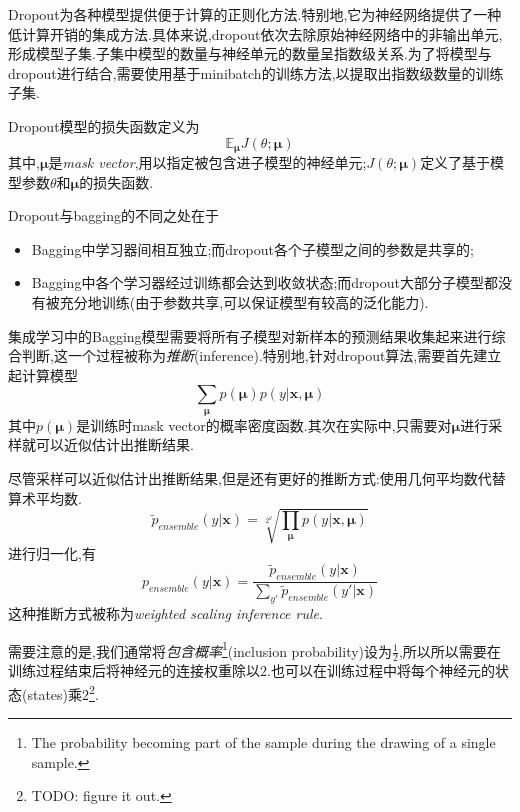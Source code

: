 Dropout为各种模型提供便于计算的正则化方法.特别地,它为神经网络提供了一种低计算开销的集成方法.具体来说,dropout依次去除原始神经网络中的非输出单元,形成模型子集.子集中模型的数量与神经单元的数量呈指数级关系.为了将模型与dropout进行结合,需要使用基于minibatch的训练方法,以提取出指数级数量的训练子集.

Dropout模型的损失函数定义为
\begin{equation}
\mathbb E_{\mathbf\mu}J(\theta;\mathbf\mu)
\end{equation}
其中,$\mathbf\mu$是\textit{mask vector},用以指定被包含进子模型的神经单元;$J(\theta;\mathbf\mu)$定义了基于模型参数$\theta$和$\mathbf\mu$的损失函数.

Dropout与bagging的不同之处在于
\begin{itemize}
    \item Bagging中学习器间相互独立;而dropout各个子模型之间的参数是共享的;
    \item Bagging中各个学习器经过训练都会达到收敛状态;而dropout大部分子模型都没有被充分地训练(由于参数共享,可以保证模型有较高的泛化能力).
\end{itemize}

集成学习中的Bagging模型需要将所有子模型对新样本的预测结果收集起来进行综合判断,这一个过程被称为\textit{推断}(inference).特别地,针对dropout算法,需要首先建立起计算模型
\begin{equation}
\sum_{\mathbf\mu}p(\mathbf\mu)p(y|\mathbf{x,\mu})
\end{equation}
其中$p(\mathbf\mu)$是训练时mask vector的概率密度函数.其次在实际中,只需要对$\mathbf\mu$进行采样就可以近似估计出推断结果.

尽管采样可以近似估计出推断结果,但是还有更好的推断方式:使用几何平均数代替算术平均数.
\begin{equation}
\tilde p_{ensemble}(y|\mathbf x)=\sqrt[2^d]{\prod_{\mathbf\mu}p(y|\mathbf{x,\mu})}
\end{equation}
进行归一化,有
\begin{equation}
p_{ensemble}(y|\mathbf x)=\frac{\tilde p_{ensemble}(y|\mathbf x)}{\sum_{y'}\tilde p_{ensemble}(y'|\mathbf x)}
\end{equation}
这种推断方式被称为\textit{weighted scaling inference rule}.

需要注意的是,我们通常将\textit{包含概率}\footnote{The probability becoming part of the sample during the drawing of a single sample.}(inclusion probability)设为$\frac{1}{2}$,所以所以需要在训练过程结束后将神经元的连接权重除以$2$.也可以在训练过程中将每个神经元的状态(states)乘$2$\footnote{TODO: figure it out.}.

